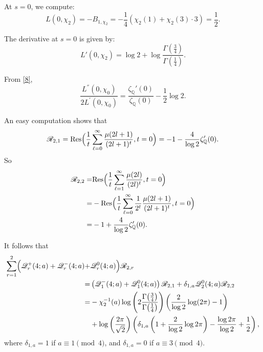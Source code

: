 \documentclass[12pt]{amsart}
\newcommand{\Q}{\mathbb{Q}}
\begin{document}
At $s=0$, we compute:
\[
L(0, \chi_2) = -B_{1,\chi_2} = -\frac{1}{4} \left( \chi_2(1) + \chi_2(3) \cdot 3 \right) = \frac{1}{2}.
\]


The derivative at $s=0$ is given by:
\[
L'(0, \chi_2) = \log 2 + \log \frac{\Gamma\!\left(\frac{3}{4}\right)}{\Gamma\!\left(\frac{1}{4}\right)}.
\]


From \eqref{8},
\[
 \frac{L^{''} (0,{\chi_0})}{ 2L^{'} (0,{\chi_0})}=\frac{\zeta_\Q'(0)}{\zeta_\Q(0)}-\frac{1}{2}\log 2.
 \]

An easy computation shows  that
\[
\mathscr{R}_{2,1}=\mathrm{Res}\Bigl(\frac{1}{t}\sum_{\ell=0}^\infty \frac{\mu(2l+1)}{(2l+1)^t},t=0\Bigr)=-1-\frac{4}{\log 2} \zeta_\Q'(0).
\]
So
\[
\begin{split}
\mathscr{R}_{2,2}=&\mathrm{Res}\Bigl(\frac{1}{t}\sum_{\ell=1}^\infty    \frac{\mu(2l)}{(2l)^t},t=0 \Bigr)\\
=&-\mathrm{Res}\Bigl(\frac{1}{t}\sum_{\ell=0}^\infty  \frac{1}{2^t}  \frac{\mu(2l+1)}{(2l+1)^t},t=0\Bigr)\\ 
=&-1+\frac{4}{\log 2} \zeta_\Q'(0).
\end{split}
\]

It follows that
\begin{equation*}
\begin{split}
\sum_{r=1}^{2} \Bigl( \mathscr{Q}_r^+(4; a) + \mathscr{Q}_r^-(4; a) +& \mathscr{Q}_r^0(4; a) \Bigr) \mathscr{R}_{2,r}\\
= &\left( \mathscr{Q}_1^-(4; a) + \mathscr{Q}_1^0(4; a) \right) \mathscr{R}_{2,1} + \delta_{1,a} \mathscr{Q}_2^0(4; a) \mathscr{R}_{2,2} \\
= &-\chi_2^{-1}(a) \log \left( 2 \frac{\Gamma\!\left(\frac{3}{4}\right)}{\Gamma\!\left(\frac{1}{4}\right)} \right) \left( \frac{2}{\log 2} \log (2\pi) - 1 \right) \\
&+ \log \left( \frac{2\pi}{\sqrt{2}} \right) \left( \delta_{1,a} \left( 1 + \frac{2}{\log 2} \log 2\pi \right) - \frac{\log 2\pi}{\log 2} + \frac{1}{2} \right),
\end{split}
\end{equation*}
where $\delta_{1,a} = 1$ if $a \equiv 1 \pmod{4}$, and $\delta_{1,a} = 0$ if $a \equiv 3 \pmod{4}$.\\
\end{document}
